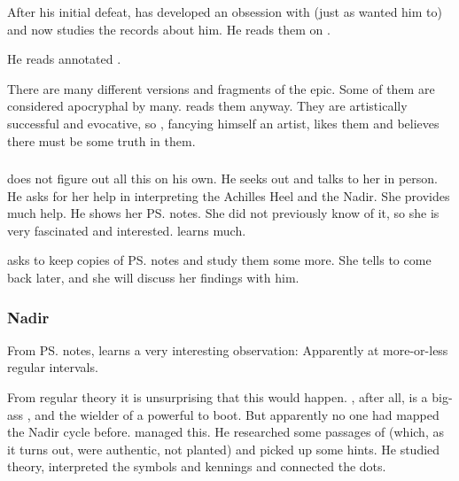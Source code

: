 After his initial defeat, \Teshrial{} has developed an obsession with \Ishnaruchaefir{} (just as \Ishnaruchaefir{} wanted him to) and now studies the records about him. 
He reads them on . 

He reads  annotated \emph{}. 

There are many different versions and fragments of the epic. 
Some of them are considered apocryphal by many. 
\Teshrial{} reads them anyway. 
They are artistically successful and evocative, so \Teshrial, fancying himself an artist, likes them and believes there must be some truth in them. 






\subsubsection{\Urizeth}
\Teshrial{} does not figure out all this on his own. 
He seeks out \Urizeth{} and talks to her in person. 
He asks for her help in interpreting the Achilles Heel and the Nadir. 
She provides much help. 
He shows her \ps{\Lothagiel} notes. 
She did not previously know of it, so she is very fascinated and interested. 
\Teshrial{} learns much. 

\Urizeth{} asks to keep copies of \ps{\Lothagiel} notes and study them some more. 
She tells \Teshrial{} to come back later, and she will discuss her findings with him. 





\subsubsection{Nadir}
From \ps{\Lothagiel} notes, \Teshrial{} learns a very interesting observation: 
Apparently  at more-or-less regular intervals. 

From regular \matrix{} theory it is unsurprising that this would happen. 
\Ishnaruchaefir, after all, is a big-ass \vertex, and the wielder of a powerful  to boot. 
But apparently no one had mapped the Nadir cycle before. 
\Lothagiel{} managed this. 
He researched some passages of \WanderersInDarknessEmph (which, as it turns out, were authentic, not planted) and picked up some hints. 
He studied \matrix{} theory, interpreted the symbols and kennings and connected the dots. 


